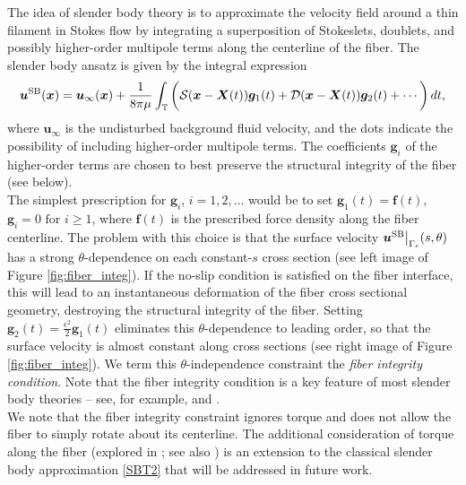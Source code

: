 \documentclass[11pt]{article}
\numberwithin{equation}{section}
\newcommand{\T}{\mathbb{T}}
\newcommand{\bu}{\bm{u}}
\newcommand{\bx}{\bm{x}}
\newcommand{\X}{\bm{X}}
\newcommand{\ts}{\thinspace}
\newcommand{\SB}{{\rm SB}}
\theoremstyle{definition}
\begin{document}
The idea of slender body theory is to approximate the velocity field around a thin filament in Stokes flow by integrating a superposition of Stokeslets, doublets, and possibly higher-order multipole terms along the centerline of the fiber. The slender body ansatz is given by the integral expression
\begin{equation}\label{SB_ansatz}
\bu^{\SB}(\bx) = \bu_{\infty}(\bx) + \frac{1}{8\pi\mu} \int_{\T} \bigg(\mathcal{S}(\bx-\X(t)) {\bm g}_1(t) +\mathcal{D}(\bx-\X(t)) {\bm g}_2(t)+\cdots \bigg)\ts dt,
\end{equation}
where $\bu_{\infty}$ is the undisturbed background fluid velocity, and the dots indicate the possibility of including higher-order multipole terms. The coefficients ${\bm g}_i$ of the higher-order terms are chosen to best preserve the structural integrity of the fiber (see below). \\

The simplest prescription for $\bm{g}_i$, $i=1,2,\dots$ would be to set $\bm{g}_1(t)=\bm{f}(t)$, $\bm{g}_i=0 \text{ for } i\ge 1$, where $\bm{f}(t)$ is the prescribed force density along the fiber centerline. The problem with this choice is that the surface velocity $\bu^{\SB}\big|_{\Gamma_\epsilon}(s,\theta)$ has a strong $\theta$-dependence on each constant-$s$ cross section (see left image of Figure \ref{fig:fiber_integ}). If the no-slip condition is satisfied on the fiber interface, this will lead to an instantaneous deformation of the fiber cross sectional geometry, destroying the structural integrity of the fiber. Setting $\bm{g}_2(t)=\frac{\epsilon^2}{2}\bm{g}_1(t)$ eliminates this $\theta$-dependence to leading order, so that the surface velocity is almost constant along cross sections (see right image of Figure \ref{fig:fiber_integ}). We term this $\theta$-independence constraint the {\em fiber integrity condition}. Note that the fiber integrity condition is a key feature of most slender body theories -- see, for example, \cite{tornberg2004simulating} and \cite{cox1970motion}. \\

We note that the fiber integrity constraint ignores torque and does not allow the fiber to simply rotate about its centerline. The additional consideration of torque along the fiber (explored in \cite{keller1976slender}; see also \cite{lim2004simulations}) is an extension to the classical slender body approximation \eqref{SBT2} that will be addressed in future work. \\
\end{document}
